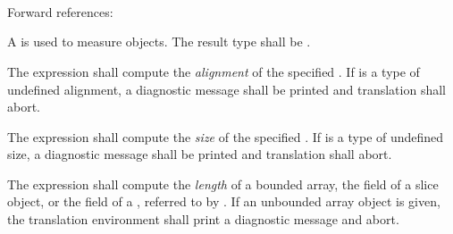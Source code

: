 \begin{grammar}
 \\
	 \\
	 \\
	 \\
	 \\

 \\
	 \terminal{(}  \terminal{)} \\

 \\
	 \terminal{(}  \terminal{)} \\

 \\
	 \terminal{(}  \terminal{)} \\

 \\
	 \terminal{(}  \terminal{)} \\
\end{grammar}

Forward references: 

\specsubsubitem
A  is used to measure objects. The result
type shall be .

\specsubsubitem
The  expression shall compute the \textit{alignment} of the specified
. If  is a type of undefined alignment, a
diagnostic message shall be printed and translation shall abort.

\specsubsubitem
The  expression shall compute the \textit{size} of the specified
. If  is a type of undefined size, a
diagnostic message shall be printed and translation shall abort.

\specsubsubitem
The  expression shall compute the \textit{length} of a bounded
array, the  field of a slice object, or the  field of
a , referred to by . If an unbounded array
object is given, the translation environment shall print a diagnostic message
and abort.

